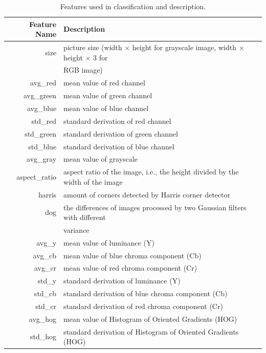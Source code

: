 \documentclass[a4paper, 11pt]{article}
\begin{document}
\begin{table}[!htb]
\begin{center}
\begin{tabular}{r|l}
\hline
\textbf{Feature Name}         & \textbf{Description} \\ \hline
size          & picture size (width $\times$ height for grayscale image, width $\times$ height $\times$ 3 for \\
& RGB image) \\ \hline
avg\_red      & mean value of red channel                   \\ \hline
avg\_green    & mean value of green channel                    \\ \hline
avg\_blue     & mean value of blue channel                    \\ \hline
std\_red      & standard derivation of red channel                    \\ \hline
std\_green    & standard derivation of green channel                    \\ \hline
std\_blue     & standard derivation of blue channel                    \\ \hline
avg\_gray     & mean value of grayscale                     \\ \hline
aspect\_ratio & aspect ratio of the image, i.e., the height divided by the width of the image      \\ \hline
harris        & amount of corners detected by Harris corner detector~\cite{harris1988}   \\ \hline
dog           & the differences of images processed by two Gaussian filters with different \\
& variance\\ \hline
avg\_y        & mean value of luminance (Y)     \\ \hline
avg\_cb       & mean value of blue chroma component (Cb)  \\ \hline
avg\_cr       & mean value of red chroma component (Cr)  \\ \hline
std\_y        & standard derivation of luminance (Y)  \\ \hline
std\_cb       & standard derivation of blue chroma component (Cb)                \\ \hline
std\_cr       & standard derivation of red chroma component (Cr) \\ \hline
avg\_hog      & mean value of Histogram of Oriented Gradients (HOG)\cite{hog}              \\ \hline
std\_hog      & standard derivation of Histogram of Oriented Gradients (HOG)               \\ \hline
\end{tabular}
\end{center}
\caption{\label{tab:feature} Features used in classification and description.}
\end{table}
\end{document}
